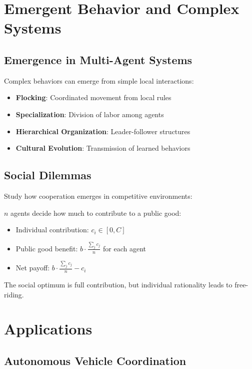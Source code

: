 \section{Emergent Behavior and Complex Systems}

\subsection{Emergence in Multi-Agent Systems}

Complex behaviors can emerge from simple local interactions:

\begin{itemize}
    \item \textbf{Flocking}: Coordinated movement from local rules
    \item \textbf{Specialization}: Division of labor among agents
    \item \textbf{Hierarchical Organization}: Leader-follower structures
    \item \textbf{Cultural Evolution}: Transmission of learned behaviors
\end{itemize}

\subsection{Social Dilemmas}

Study how cooperation emerges in competitive environments:

\begin{examplebox}
$n$ agents decide how much to contribute to a public good:
\begin{itemize}
    \item Individual contribution: $c_i \in [0, C]$
    \item Public good benefit: $b \cdot \frac{\sum_j c_j}{n}$ for each agent
    \item Net payoff: $b \cdot \frac{\sum_j c_j}{n} - c_i$
\end{itemize}

The social optimum is full contribution, but individual rationality leads to free-riding.
\end{examplebox}

\section{Applications}

\subsection{Autonomous Vehicle Coordination}

